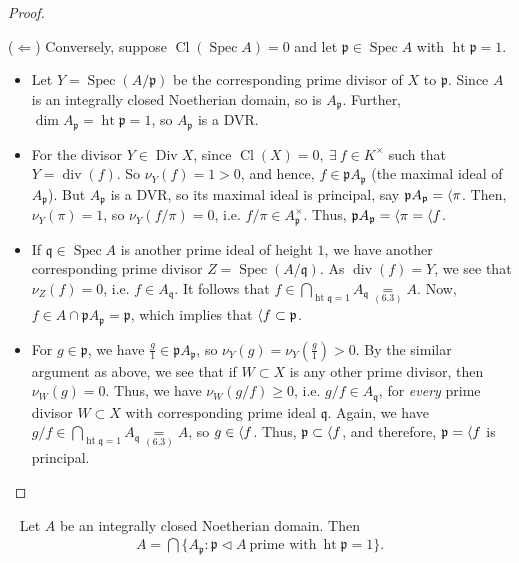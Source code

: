 \documentclass[11pt,a4paper,footinclude=true,headinclude=true]{scrbook} %
\DeclareMathOperator{\Spec}{Spec}
\DeclareMathOperator{\Ht}{ht}
\DeclareMathOperator{\Div}{Div}
\DeclareMathOperator{\Cl}{Cl}
\DeclareMathOperator{\dv}{div}
\newcommand{\pp}{\mathfrak{p}}
\newcommand{\qq}{\mathfrak{q}}
\newcommand{\<}{\langle}
\let\>\relax
\newcommand{\>}{\rangle}
\newenvironment{proposition}[2][]
{\renewcommand\theinnercustomprop{#2}\innercustomprop[#1] 
\begin{mdframed}[backgroundcolor=gray!20]\ }
{\end{mdframed}\endinnercustomprop}
\begin{document}
\begin{proof}
\begin{itemize}
\begin{itemize}
        \end{itemize}
        ($\Leftarrow$) Conversely, suppose $\Cl(\Spec A)=0$ and let $\pp\in\Spec A$ with $\Ht\pp=1$.
        \begin{itemize}
            \item Let $Y=\Spec(A/\pp)$ be the corresponding prime divisor of $X$ to $\pp$. Since $A$ is an integrally closed Noetherian domain, so is $A_\pp$. Further, $\dim A_\pp=\Ht\pp=1$, so $A_\pp$ is a DVR.
            \item For the divisor $Y\in\Div X$, since $\Cl(X)=0,\ \exists\ f\in K^\times$ such that $Y=\dv(f)$. So $\nu_Y(f)=1>0$, and hence, $f\in\pp A_\pp$ (the maximal ideal of $A_\pp$). But $A_\pp$ is a DVR, so its maximal ideal is principal, say $\pp A_\pp=\<\pi\>$. Then, $\nu_Y(\pi)=1$, so $\nu_Y(f/\pi)=0$, i.e. $f/\pi\in A_\pp^\times$. Thus, $\pp A_\pp=\<\pi\>=\<f\>$.
            \item If $\qq\in\Spec A$ is another prime ideal of height $1$, we have another corresponding prime divisor $Z=\Spec(A/\qq)$. As $\dv(f)=Y$, we see that $\nu_Z(f)=0$, i.e. $f\in A_\qq$. It follows that $f\in\bigcap_{\Ht\qq=1}A_\qq\underset{(6.3)}{=}A$. Now, $f\in A\cap\pp A_\pp=\pp$, which implies that $\<f\>\subset\pp$.
            \item For $g\in\pp$, we have $\frac{g}{1}\in\pp A_\pp$, so $\nu_Y(g)=\nu_Y(\frac{g}{1})>0$. By the similar argument as above, we see that if $W\subset X$ is any other prime divisor, then $\nu_W(g)=0$. Thus, we have $\nu_W(g/f)\geq0$, i.e. $g/f\in A_\qq$, for \textit{every} prime divisor $W\subset X$ with corresponding prime ideal $\qq$. Again, we have $g/f\in\bigcap_{\Ht\qq=1}A_\qq\underset{(6.3)}{=}A$, so $g\in\<f\>$. Thus, $\pp\subset\<f\>$, and therefore, $\pp=\<f\>$ is principal.
        \end{itemize}
    \end{itemize}
\end{proof}

\begin{proposition}{6.3}
    Let $A$ be an integrally closed Noetherian domain. Then 
    \begin{align*}
        A=\bigcap\{A_\pp:\pp\triangleleft A\ \text{prime with}\ \Ht\pp=1\}.
    \end{align*}
\end{proposition}
\end{document}
